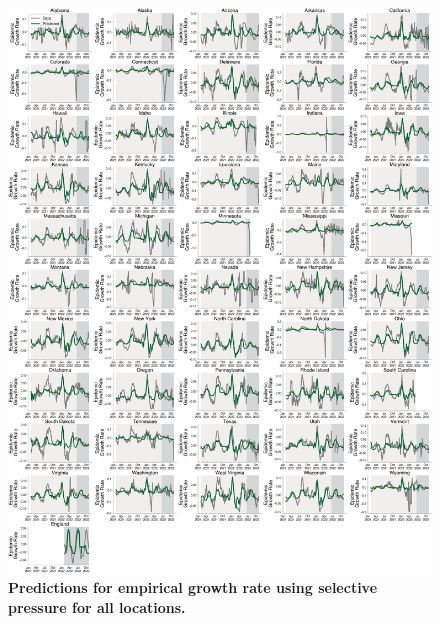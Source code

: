 \documentclass[11pt,oneside,letterpaper]{article}
\def\tbc#1{\textcolor{purple}{[#1]}}
\begin{document}
\begin{figure}[t!]
    \centering
    \includegraphics[width=1.0\textwidth=0.01]{./supplementary_figures/empirical_growth_rate_predictions_all.png}
    \caption{
      \textbf{Predictions for empirical growth rate using selective pressure for all locations.}
    }
    \label{fig:empirical_growth_rate_predictions_all}
\end{figure}
\end{document}
